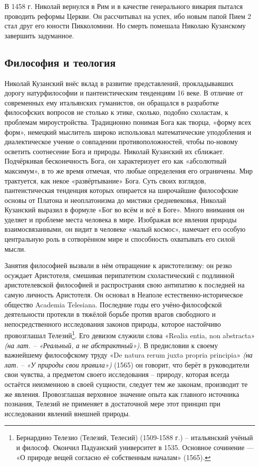 \documentclass[a4paper, 14pt]{extreport}
\begin{document}
В 1458 г. Николай вернулся в Рим и в качестве генерального викария
пытался проводить реформы Церкви. Он рассчитывал на успех, ибо новым
папой Пием 2 стал друг его юности Пикколомини. Но смерть помешала
Николаю Кузанскому завершить задуманное.

\subsection{Философия и теология}

Николай Кузанский внёс вклад в развитие представлений, прокладывавших
дорогу натурфилософии и пантеистическим тенденциям 16 веке. В отличие от
современных ему итальянских гуманистов, он обращался в разработке
философских вопросов не столько к этике, сколько, подобно схоластам, к
проблемам мироустройства. Традиционно понимая Бога как творца, «форму
всех форм», немецкий мыслитель широко использовал математические
уподобления и диалектическое учение о совпадении противоположностей,
чтобы по-новому осветить соотнесение Бога и природы. Николай Кузанский
их сближает. Подчёркивая бесконечность Бога, он характеризует его как
«абсолютный максимум», в то же время отмечая, что любые определения его
ограничены. Мир трактуется, как некое «развёртывание» Бога. Суть своих
взглядов, пантеистическая тенденция которых опирается на широчайшие
философские основы от Платона и неоплатонизма до мистики средневековья,
Николай Кузанский выразил в формуле «Бог во всём и всё в Боге». Много
внимания он уделяет и проблеме места человека в мире. Изображая все
явления природы взаимосвязанными, он видит в человеке «малый космос»,
намечает его особую центральную роль в сотворённом мире и способность
охватывать его силой мысли.

Занятия философией вызвали в нём отвращение к аристотелизму: он резко
осуждает Аристотеля, смешивая перипатетизм схоластический с подлинной
аристотелевской философией и распространяя свою антипатию к последней на
самую личность Аристотеля. Он основал в Неаполе естественно-историческое
общество Academia Telesiana. Последние годы его учёно-философской
деятельности протекли в тяжёлой борьбе против врагов свободного и
непосредственного исследования законов природы, которое настойчиво
провозглашал Телезий\footnote{Бернардино Телезио (Телезий, Телесий)
  (1509-1588 г.) -- итальянский учёный и философ. Окончил Падуанский
  университет в 1535. Основное сочинение --- «О природе вещей согласно
  её собственным началам» (1565).}. Его девизом служили слова «Realia
entia, non abstracta» \emph{(на лат. -- «Реальный, а не абстрактный»)}.
В предисловии к своему важнейшему философскому труду «De natura rerum
juxta propria principia» \emph{(на лат. -- «У природы свои правила»)}
(1565) он говорит, что берёт в руководители свои чувства, а предметом
своего исследования -- природу, которая всегда остаётся неизменною в
своей сущности, следует тем же законам, производит те же явления.
Провозглашая верховное значение опыта как главного источника познания,
Телезий не применяет в достаточной мере этот принцип при исследовании
явлений внешней природы.
\end{document}
